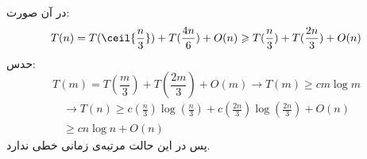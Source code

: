 {\begin{enumerate}[]
در آن صورت:
\begin{equation*}
T(n)=T(\ceil{\frac{n}{3}})+T(\frac{4n}{6})+O(n) \geqslant T(\frac{n}{3})+T(\frac{2n}{3})+O(n)
\end{equation*}
حدس:
\begin{equation*}
T(m)=T(\frac{m}{3})+T(\frac{2m}{3})+O(m) \rightarrow 
T(m) \geqslant cm \log{m}  
\end{equation*}
\begin{align*}
\rightarrow T(n) \geqslant c(\frac{n}{3}) \log{(\frac{n}{3})}+c(\frac{2n}{3}) \log{(\frac{2n}{3})} + O(n) \\
\geqslant cn \log{n} + O(n)
\end{align*}پس در این حالت مرتبه‌ی زمانی خطی ندارد.

\end{enumerate}

}









